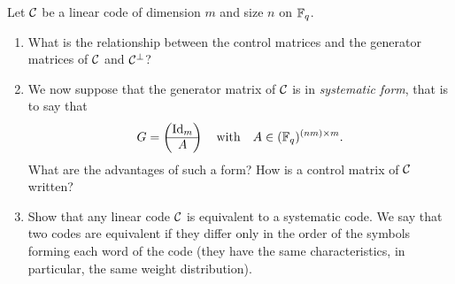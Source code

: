  
\begin{exo}
\label{exo-matrices-generator-control}
 
  Let $ \mathcal{C} $ be a linear code of dimension $ m $ and size $ n $ on $ \mathbb{F}_q $. \begin{enumerate}
\item What is the relationship between the control matrices and the generator matrices of $ \mathcal{C} $ and $ \mathcal{C}^\bot $?
\item {} We now suppose that the generator matrix of $ \mathcal{C} $ is in \textit{systematic form}, that is to say that
\begin{equation*}
G = \begin{pmatrix} \operatorname{Id}_m \\\hline A \end{pmatrix} \quad \text{with} \quad A \in (\mathbb{F}_q)^{(nm) \times m}.
\end{equation*}
What are the advantages of such a form? How is a control matrix of $ \mathcal{C} $ written?
\item {} Show that any linear code $ \mathcal{C} $ is equivalent to a systematic code. We say that two codes are equivalent if they differ only in the order of the symbols forming each word of the code (they have the same characteristics, in particular, the same weight distribution).
\end{enumerate}
\end{exo}
 
